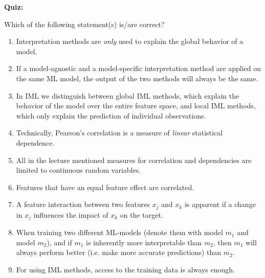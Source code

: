 \textbf{Quiz:}\\ \noindent
\vspace{0.1cm}

Which of the following statement(s) is/are correct?  
\begin{enumerate}
    \item Interpretation methods are \textit{only} used to explain the global behavior of a model. 

    
    \item If a model-agnostic and a model-specific interpretation method are applied on the same ML model, the output of the two methods will always be the same.
    
    \item In IML we distinguish between global IML methods, which explain the behavior of the model over the entire feature space, and local IML methods, which only explain the prediction of individual observations. 
    
    
    \item Technically, Pearson's correlation is a measure of \textit{linear} statistical dependence. 
    
    \item All in the lecture mentioned measures for correlation and dependencies are limited to continuous random variables.
    
    \item Features that have an equal feature effect are correlated. 

    \item A feature interaction between two features $x_j$ and $x_k$ is apparent if a change in $x_j$ influences the impact of $x_k$ on the target.
        
    \item When training two different ML-models (denote them with model \(m_1\) and model $m_2$), and if $m_1$ is inherently more interpretable than \(m_2\), then $m_1$ will always perform better (i.e. make more accurate predictions) than $m_2$.

    \item For using IML methods, access to the training data is always enough.


\end{enumerate}
